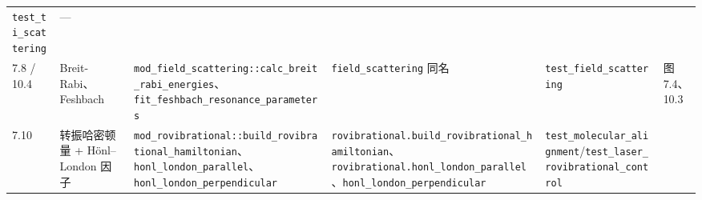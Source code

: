 \documentclass[
]{ctexbook}
\begin{document}
\begin{longtable}[]{@{}llllll@{}}
\begin{minipage}[t]{0.14\columnwidth}
\texttt{test\_ti\_scattering}\strut
\end{minipage} & \begin{minipage}[t]{0.14\columnwidth}\raggedright
---\strut
\end{minipage}\tabularnewline
\begin{minipage}[t]{0.14\columnwidth}\raggedright
7.8 / 10.4\strut
\end{minipage} & \begin{minipage}[t]{0.14\columnwidth}\raggedright
Breit-Rabi、Feshbach\strut
\end{minipage} & \begin{minipage}[t]{0.14\columnwidth}\raggedright
\texttt{mod\_field\_scattering::calc\_breit\_rabi\_energies}、\texttt{fit\_feshbach\_resonance\_parameters}\strut
\end{minipage} & \begin{minipage}[t]{0.14\columnwidth}\raggedright
\texttt{field\_scattering} 同名\strut
\end{minipage} & \begin{minipage}[t]{0.14\columnwidth}\raggedright
\texttt{test\_field\_scattering}\strut
\end{minipage} & \begin{minipage}[t]{0.14\columnwidth}\raggedright
图 7.4、10.3\strut
\end{minipage}\tabularnewline
\begin{minipage}[t]{0.14\columnwidth}\raggedright
7.10\strut
\end{minipage} & \begin{minipage}[t]{0.14\columnwidth}\raggedright
转振哈密顿量 + Hönl--London 因子\strut
\end{minipage} & \begin{minipage}[t]{0.14\columnwidth}\raggedright
\texttt{mod\_rovibrational::build\_rovibrational\_hamiltonian}、\texttt{honl\_london\_parallel}、\texttt{honl\_london\_perpendicular}\strut
\end{minipage} & \begin{minipage}[t]{0.14\columnwidth}\raggedright
\texttt{rovibrational.build\_rovibrational\_hamiltonian}、\texttt{rovibrational.honl\_london\_parallel}、\texttt{honl\_london\_perpendicular}\strut
\end{minipage} & \begin{minipage}[t]{0.14\columnwidth}\raggedright
\texttt{test\_molecular\_alignment}/\texttt{test\_laser\_rovibrational\_control}\strut
\end{minipage} & \begin{minipage}[t]{0.14\columnwidth}\raggedright

\end{minipage}
\end{longtable}
\end{document}
